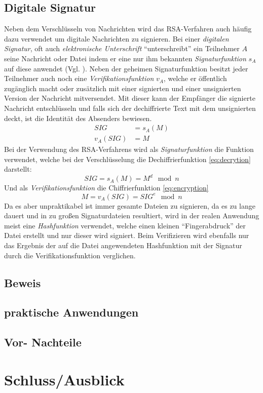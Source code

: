 \documentclass{scrarticle} %
\begin{document}
    \subsection{Digitale Signatur}
        Neben dem Verschlüsseln von Nachrichten wird das RSA-Verfahren auch häufig dazu verwendet um digitale Nachrichten zu signieren. Bei einer \emph{digitalen Signatur}, oft auch \emph{elektronische Unterschrift} \enquote{unterschreibt} ein Teilnehmer $A$ seine Nachricht oder Datei indem er eine nur ihm bekannten \emph{Signaturfunktion} $s_A$ auf diese anwendet (Vgl. \cite[40-43]{beutelspacher2015}). Neben der geheimen Signaturfunktion besitzt jeder Teilnehmer auch noch eine \emph{Verifikationsfunktion} $v_A$, welche er öffentlich zugänglich macht oder zusätzlich mit einer signierten und einer unsignierten Version der Nachricht mitversendet. Mit dieser kann der Empfänger die signierte Nachricht entschlüsseln und falls sich der dechiffrierte Text mit dem unsignierten deckt, ist die Identität des Absenders bewiesen.
        \begin{align}
            SIG &= s_A(M) \\
            v_A(SIG) &= M
        \end{align}
        Bei der Verwendung des RSA-Verfahrens wird als \emph{Signaturfunktion} die Funktion verwendet, welche bei der Verschlüsselung die Dechiffrierfunktion \ref{eq:decrytion} darstellt:
        \begin{equation}
            SIG = s_A(M) = M^{d}\mod{n}
        \end{equation}
        Und als \emph{Verifikationsfunktion} die Chiffrierfunktion \ref{eq:encryption}
        \begin{equation}
            M = v_A(SIG) = SIG^{e}\mod{n}
        \end{equation}
        Da es aber unpraktikabel ist immer gesamte Dateien zu signieren, da es zu lange dauert und in zu großen Signaturdateien resultiert, wird in der realen Anwendung meist eine \emph{Hashfunktion} verwendet, welche einen kleinen \enquote{Fingerabdruck} der Datei erstellt und nur dieser wird signiert. Beim Verifizieren wird ebenfalls nur das Ergebnis der auf die Datei angewendeten Hashfunktion mit der Signatur durch die Verifikationsfunktion verglichen.

    \subsection{Beweis}

    \subsection{praktische Anwendungen}

    \subsection{Vor-  Nachteile}

    \section{Schluss/Ausblick}

    \newpage
    \printbibliography
    \newpage
    
\end{document}

